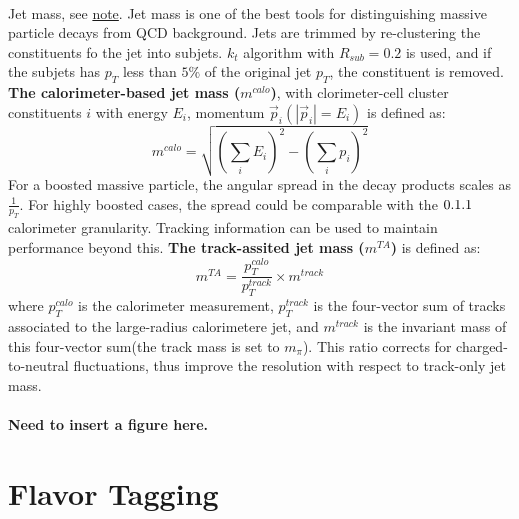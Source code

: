 \paragraph{}
Jet mass, see \href{https://cds.cern.ch/record/2200211/files/ATLAS-CONF-2016-035.pdf}{note}. Jet mass is one of the best tools for distinguishing massive particle decays from QCD background. Jets are trimmed by re-clustering the constituents fo the jet into subjets. $k_t$ algorithm with $R_{sub} = 0.2$ is used, and if the subjets has $p_T$ less than $5\%$ of the original jet $p_T$, the constituent is removed. \textbf{The calorimeter-based jet mass ($m^{calo}$)}, with clorimeter-cell cluster constituents $i$ with energy $E_i$, momentum $\vec{p}_i (|\vec{p}_i| = E_i)$ is defined as:
\begin{equation}
m^{calo} = \sqrt{(\sum_i E_i)^2 - (\sum_i p_i)^2}
\end{equation}
For a boosted massive particle, the angular spread in the decay products scales as $\frac{1}{p_T}$. For highly boosted cases, the spread could be comparable with the $0.1\time0.1$ calorimeter granularity. Tracking information can be used to maintain performance beyond this. \textbf{The track-assited jet mass ($m^{TA}$)} is defined as:
\begin{equation}
m^{TA} = \frac{p_{T}^{calo}}{p_{T}^{track}} \times m^{track}
\end{equation}
where $p_{T}^{calo}$ is the calorimeter measurement, $p_{T}^{track}$ is the four-vector sum of tracks associated to the large-radius calorimetere jet, and $m^{track}$ is the invariant mass of this four-vector sum(the track mass is set to $m_{\pi}$). This ratio corrects for charged-to-neutral fluctuations, thus improve the resolution with respect to track-only jet mass.

\paragraph{Need to insert a figure here.}

\section{Flavor Tagging}
